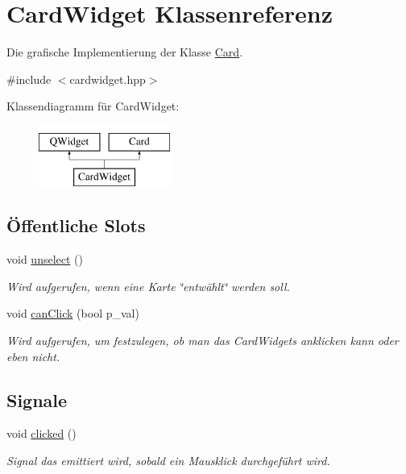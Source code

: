 \hypertarget{class_card_widget}{}\section{Card\+Widget Klassenreferenz}
\label{class_card_widget}


Die grafische Implementierung der Klasse \hyperlink{class_card}{Card}.  




{\ttfamily \#include $<$cardwidget.\+hpp$>$}

Klassendiagramm für Card\+Widget\+:\begin{figure}[H]
\begin{center}
\leavevmode
\includegraphics[height=2.000000cm]{class_card_widget}
\end{center}
\end{figure}
\subsection*{Öffentliche Slots}
\begin{DoxyCompactItemize}
\item 
void \hyperlink{class_card_widget_abdf86e7c69cb8d15076a84f61d277797}{unselect} ()
\begin{DoxyCompactList}\small\item\em Wird aufgerufen, wenn eine Karte \char`\"{}entwählt\char`\"{} werden soll. \end{DoxyCompactList}\item 
void \hyperlink{class_card_widget_a67c140043176fa3a911b05d5c11b2115}{can\+Click} (bool p\+\_\+val)
\begin{DoxyCompactList}\small\item\em Wird aufgerufen, um festzulegen, ob man das Card\+Widgets anklicken kann oder eben nicht. \end{DoxyCompactList}\end{DoxyCompactItemize}
\subsection*{Signale}
\begin{DoxyCompactItemize}
\item 
void \hyperlink{class_card_widget_ab3f3a9b457b76a117c218cc1993ee1e4}{clicked} ()
\begin{DoxyCompactList}\small\item\em Signal das emittiert wird, sobald ein Mausklick durchgeführt wird. \end{DoxyCompactList}\end{DoxyCompactItemize}
